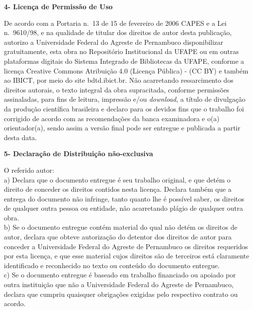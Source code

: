 \documentclass[10pt,a4paper]{article}
\newcommand{\gap}[2]{\vspace{#2mm}}
\begin{document}
\gap{obs-4}{1.0}

\noindent\textbf{4- Licença de Permissão de Uso}
\gap{4-p1}{-1.6}
\begin{justify}
De acordo com a Portaria n.\ 13 de 15 de fevereiro de 2006 CAPES e a Lei n.\ 9610/98, e na qualidade de titular dos direitos de autor desta publicação, autorizo a Universidade Federal do Agreste de Pernambuco disponibilizar gratuitamente, esta obra no Repositório Institucional da UFAPE ou em outras plataformas digitais do Sistema Integrado de Bibliotecas da UFAPE, conforme a licença Creative Commons Atribuição 4.0 (\textquotedbl Licença Pública\textquotedbl) - (CC BY) e também ao IBICT, por meio do site bdtd.ibict.br. Não acarretando ressarcimento dos direitos autorais, o texto integral da obra supracitada, conforme permissões assinaladas, para fins de leitura, impressão e/ou \textit{download}, a título de divulgação da produção científica brasileira e declaro para os devidos fins que o trabalho foi corrigido de acordo com as recomendações da banca examinadora e o(a) orientador(a), sendo assim a versão final pode ser entregue e publicada a partir desta data.
\end{justify}

\gap{4-5}{1.0}

\noindent\textbf{5- Declaração de Distribuição não-exclusiva}
\gap{5-ref}{1.2}
\begin{justify}
O referido autor:\\
a) Declara que o documento entregue é seu trabalho original, e que detém o direito de conceder os direitos contidos nesta licença. Declara também que a entrega do documento não infringe, tanto quanto lhe é possível saber, os direitos de qualquer outra pessoa ou entidade, não acarretando plágio de qualquer outra obra.\\
b) Se o documento entregue contém material do qual não detém os direitos de autor, declara que obteve autorização do detentor dos direitos de autor para conceder a Universidade Federal do Agreste de Pernambuco os direitos requeridos por esta licença, e que esse material cujos direitos são de terceiros está claramente identificado e reconhecido no texto ou conteúdo do documento entregue.\\
c) Se o documento entregue é baseado em trabalho financiado ou apoiado por outra instituição que não a Universidade Federal do Agreste de Pernambuco, declara que cumpriu quaisquer obrigações exigidas pelo respectivo contrato ou acordo.
\end{justify}
\end{document}
